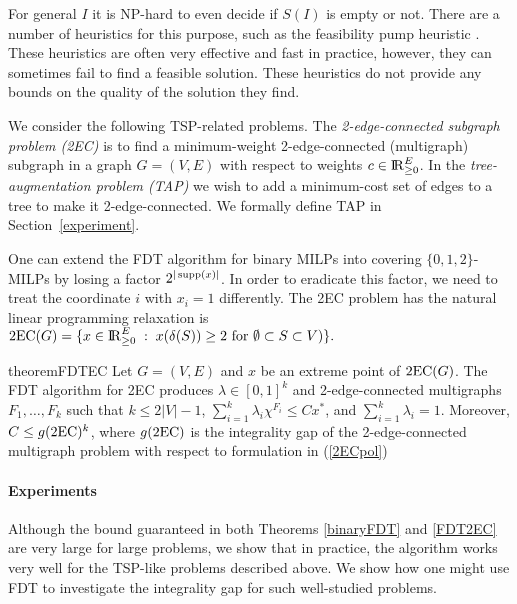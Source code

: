 For general $I$ it is NP-hard to even decide if $S(I)$ is empty or not. There are a number of heuristics for this purpose, such as the feasibility pump heuristic \cite{fp1,fp2}. These heuristics are often very effective and fast in practice, however, they can sometimes fail to find a feasible solution. These heuristics do not provide any bounds on the quality of the solution they find. 

We consider the following TSP-related problems.  The {\em 2-edge-connected subgraph problem (2EC)} is to find a minimum-weight 2-edge-connected (multigraph) subgraph
in a graph $G=(V,E)$ with respect to weights $c\in {\rm I\!R}^E_{\geq 0}$. In the {\em tree-augmentation problem (TAP)} we wish to add a minimum-cost set of edges to a tree to make it 2-edge-connected.  We formally define TAP in Section~\ref{experiment}.

One can extend the FDT algorithm for binary MILPs into covering $\{0,1,2\}$-MILPs by losing a factor $2^{|\operatorname{supp}(x)|}$. In order to eradicate this factor, we need to treat the coordinate $i$ with $x_i=1$ differently. The 2EC problem has the natural linear programming relaxation is
$\operatorname{2EC}(G)= \{x\in {\rm I\!R}_{\geq 0}^{E}\;:\; x(\delta(S))\geq 2 \text{ for $\emptyset \subset S\subset V$})\}.$

\begin{restatable}{theorem}{FDTEC}
	\label{FDT2EC}
	Let $G=(V,E)$ and $x$ be an extreme point of  $\operatorname{2EC}(G)$. The FDT algorithm for 2EC produces $\lambda\in [0,1]^k$ and 2-edge-connected multigraphs $F_1,\ldots,F_k$ such that $k\leq 2|V|-1$, $\sum_{i=1}^{k}\lambda_i \chi^{F_i}\leq Cx^*$, and $\sum_{i=1}^{k}\lambda_i = 1$. Moreover, $C\leq g({\operatorname{2EC}})^{k}$, where $g({\operatorname{2EC}})$ is the integrality gap of the 2-edge-connected multigraph problem with respect to formulation in (\ref{2ECpol}) 
\end{restatable}

\paragraph{Experiments} Although the bound guaranteed in both Theorems \ref{binaryFDT} and \ref{FDT2EC} are very large for large problems, we show that in practice, the algorithm works very well for the TSP-like problems described above. We show how one might use FDT to investigate the integrality gap for such well-studied problems.

